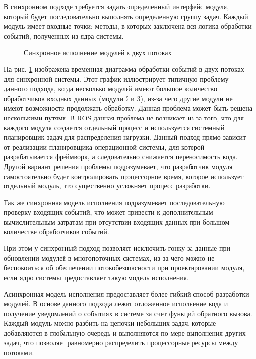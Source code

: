 
В синхронном подходе требуется задать определенный интерфейс модуля, который будет последовательно выполнять определенную группу задач. Каждый модуль имеет входные точки: методы, в которых заключена вся логика обработки событий, полученных из ядра системы.

\begin{figure}[h]
    \caption{Синхронное исполнение модулей в двух потоках}
    \label{im:2_1_1_sync}
\end{figure}

На рис. \ref{im:2_1_1_sync} изображена временная диаграмма обработки событий в двух потоках для синхронной системы. Этот график иллюстрирует типичную проблему данного подхода, когда несколько модулей имеют большое количество обработчиков входных данных (модули 2 и 3), из-за чего другие модули не имеют возможности продолжать обработку. Данная проблема может быть решена несколькими путями. В ROS данная проблема не возникает из-за того, что для каждого модуля создается отдельный процесс и используется системный планировщик задач для распределения нагрузки. Данный подход прямо зависит от реализации планировщика операционной системы, для которой разрабатывается фреймворк, а следовательно снижается переносимость кода. Другой вариант решения проблемы подразумевает, что разработчик модуля самостоятельно будет контролировать процессорное время, которое использует отдельный модуль, что существенно усложняет процесс разработки.

Так же синхронная модель исполнения подразумевает последовательную проверку входящих событий, что может привести к дополнительным вычислительным затратам при отсутствии входящих данных при большом количестве обработчиков событий.

При этом у синхронный подход позволяет исключить гонку за данные при обновлении модулей в многопоточных системах, из-за чего можно не беспокоиться об обеспечении потокобезопасности при проектировании модуля, если ядро системы предоставляет такую модель исполнения.

Асинхронная модель исполнения предоставляет более гибкий способ разработки модулей. В основе данного подхода лежит отложенное исполнение кода и получение уведомлений о событиях в системе за счет функций обратного вызова. Каждый модуль можно разбить на цепочки небольших задач, которые добавляются в глобальную очередь и выполняются по мере выполнения других задач, что позволяет равномерно распределить процессорные ресурсы между потоками.

